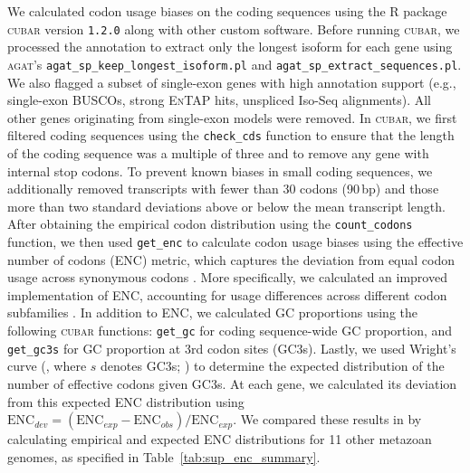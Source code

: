 We calculated codon usage biases on the \bgla{} coding sequences using the R package
\textsc{cubar} version \texttt{1.2.0} \citep{liu_cubar_2026} along with other custom
software.
Before running \textsc{cubar}, we processed the annotation to extract only the longest
isoform for each gene using \textsc{agat}'s \texttt{agat\_sp\_keep\_longest\_isoform.pl}
and \texttt{agat\_sp\_extract\_sequences.pl}.
We also flagged a subset of single-exon genes with high annotation support (e.g.,
single-exon \textsc{BUSCO}s, strong \textsc{EnTAP} hits, unspliced Iso-Seq alignments).
All other genes originating from single-exon models were removed.
In \textsc{cubar}, we first filtered coding sequences using the \texttt{check\_cds}
function to ensure that the length of the coding sequence was a multiple of three and
to remove any gene with internal stop codons.
To prevent known biases in small coding sequences, we additionally removed transcripts
with fewer than 30 codons (90\,bp) and those more than two standard deviations above or
below the mean transcript length.
After obtaining the empirical codon distribution using the \texttt{count\_codons} function,
we then used \texttt{get\_enc} to calculate codon usage biases using the effective number
of codons (ENC) metric, which captures the deviation from equal codon usage across
synonymous codons \citep{wright_effective_1990}.
More specifically, we calculated an improved implementation of ENC, accounting for
usage differences across different codon subfamilies \citep{sun_improved_2013}.
In addition to ENC, we calculated GC proportions using the following \textsc{cubar}
functions: \texttt{get\_gc} for coding sequence-wide GC proportion, and \texttt{get\_gc3s}
for GC proportion at 3rd codon sites (GC3s).
Lastly, we used Wright's curve (\wrightenc, where $s$ denotes GC3s;
\citealp{wright_effective_1990}) to determine the expected distribution of the number of
effective codons given GC3s.
At each gene, we calculated its deviation from this expected ENC distribution using
$\text{ENC}_{dev} = (\text{ENC}_{exp} - \text{ENC}_{obs}) / \text{ENC}_{exp}$.
We compared these results in \bgla{} by calculating empirical and expected ENC
distributions for 11 other metazoan genomes, as specified in Table~\ref{tab:sup_enc_summary}.
\vspace{0.1cm}

